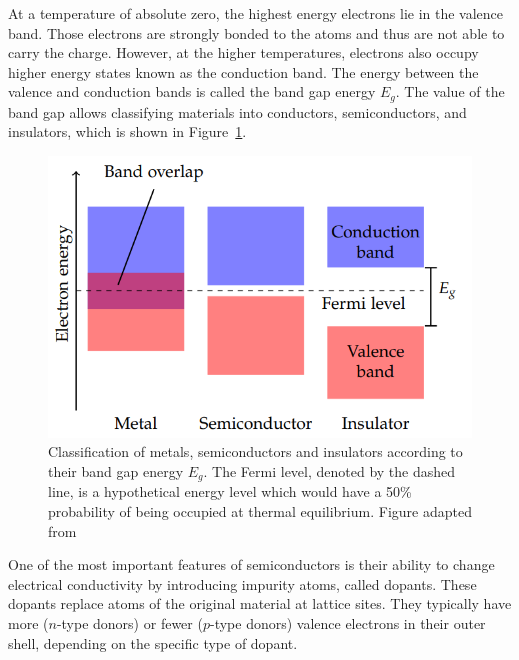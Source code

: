 At a temperature of absolute zero, the highest energy electrons lie in the valence band. Those electrons are strongly bonded to the atoms and thus are not able to carry the charge.  However, at the higher temperatures, electrons also occupy higher energy states known as the conduction band. The energy between the valence and conduction bands is called the band gap energy $E_g$.  The value of the band gap allows classifying materials into conductors, semiconductors, and insulators, which is shown in Figure~\ref{fig:boundgap}. 


\begin{figure}[h]
\centering
\includegraphics[scale=0.7]{figures/bound_gap.PNG}
\caption{Classification of metals, semiconductors and insulators according to their
band gap energy $E_g$. The Fermi level, denoted by the dashed line, is a hypothetical energy level which would have a 50\% probability of being occupied at thermal equilibrium.  Figure adapted from~\cite{radiation_damage}}
\label{fig:boundgap}
\end{figure}

One of the most important features of semiconductors is their ability to change electrical conductivity by introducing impurity atoms, called dopants. These dopants replace atoms of the original material at lattice sites. They typically have more ($n$-type donors) or fewer ($p$-type donors) valence electrons in their outer shell, depending on the specific type of dopant.  


